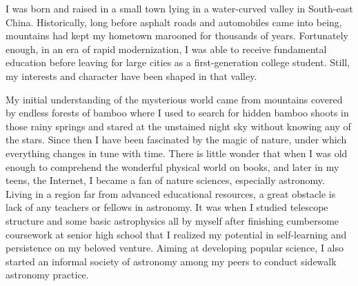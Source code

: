 \documentclass[11pt, a4paper]{awesome-cv} %
\begin{document}
\makecvheader %



\begin{cvletter}

I was born and raised in a small town lying in a water-curved valley in South-east China. Historically, long before asphalt roads and automobiles came into being, mountains had kept my hometown marooned for thousands of years. Fortunately enough, in an era of rapid modernization, I was able to receive fundamental education before leaving for large cities as a first-generation college student. Still, my interests and character have been shaped in that valley.

My initial understanding of the mysterious world came from mountains covered by endless forests of bamboo where I used to search for hidden bamboo shoots in those rainy springs and stared at the unstained night sky without knowing any of the stars. Since then I have been fascinated by the magic of nature, under which everything changes in tune with time. There is little wonder that when I was old enough to comprehend the wonderful physical world on books, and later in my teens, the Internet, I became a fan of nature sciences, especially astronomy. Living in a region far from advanced educational resources, a great obstacle is lack of any teachers or fellows in astronomy. It was when I studied telescope structure and some basic astrophysics all by myself after finishing cumbersome coursework at senior high school that I realized my potential in self-learning and persistence on my beloved venture. Aiming at developing popular science, I also started an informal society of astronomy among my peers to conduct sidewalk astronomy practice.


\end{cvletter}
\end{document}
